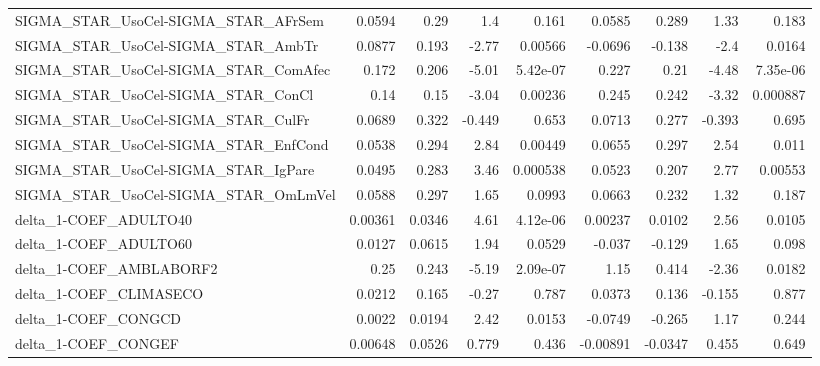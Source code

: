 \begin{tabular}{lrrrrrrrr}
SIGMA\_STAR\_UsoCel-SIGMA\_STAR\_AFrSem   &      0.0594 &         0.29 &      1.4 &    0.161 &     0.0585 &       0.289 &         1.33 &         0.183 \\
SIGMA\_STAR\_UsoCel-SIGMA\_STAR\_AmbTr    &      0.0877 &        0.193 &    -2.77 &  0.00566 &    -0.0696 &      -0.138 &         -2.4 &        0.0164 \\
SIGMA\_STAR\_UsoCel-SIGMA\_STAR\_ComAfec  &       0.172 &        0.206 &    -5.01 & 5.42e-07 &      0.227 &        0.21 &        -4.48 &      7.35e-06 \\
SIGMA\_STAR\_UsoCel-SIGMA\_STAR\_ConCl    &        0.14 &         0.15 &    -3.04 &  0.00236 &      0.245 &       0.242 &        -3.32 &      0.000887 \\
SIGMA\_STAR\_UsoCel-SIGMA\_STAR\_CulFr    &      0.0689 &        0.322 &   -0.449 &    0.653 &     0.0713 &       0.277 &       -0.393 &         0.695 \\
SIGMA\_STAR\_UsoCel-SIGMA\_STAR\_EnfCond  &      0.0538 &        0.294 &     2.84 &  0.00449 &     0.0655 &       0.297 &         2.54 &         0.011 \\
SIGMA\_STAR\_UsoCel-SIGMA\_STAR\_IgPare   &      0.0495 &        0.283 &     3.46 & 0.000538 &     0.0523 &       0.207 &         2.77 &       0.00553 \\
SIGMA\_STAR\_UsoCel-SIGMA\_STAR\_OmLmVel  &      0.0588 &        0.297 &     1.65 &   0.0993 &     0.0663 &       0.232 &         1.32 &         0.187 \\
delta\_1-COEF\_ADULTO40                 &     0.00361 &       0.0346 &     4.61 & 4.12e-06 &    0.00237 &      0.0102 &         2.56 &        0.0105 \\
delta\_1-COEF\_ADULTO60                 &      0.0127 &       0.0615 &     1.94 &   0.0529 &     -0.037 &      -0.129 &         1.65 &         0.098 \\
delta\_1-COEF\_AMBLABORF2               &        0.25 &        0.243 &    -5.19 & 2.09e-07 &       1.15 &       0.414 &        -2.36 &        0.0182 \\
delta\_1-COEF\_CLIMASECO                &      0.0212 &        0.165 &    -0.27 &    0.787 &     0.0373 &       0.136 &       -0.155 &         0.877 \\
delta\_1-COEF\_CONGCD                   &      0.0022 &       0.0194 &     2.42 &   0.0153 &    -0.0749 &      -0.265 &         1.17 &         0.244 \\
delta\_1-COEF\_CONGEF                   &     0.00648 &       0.0526 &    0.779 &    0.436 &   -0.00891 &     -0.0347 &        0.455 &         0.649 \\

\end{tabular}
